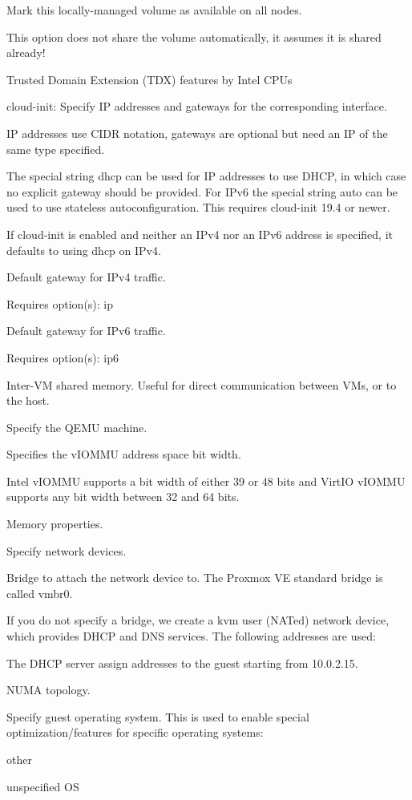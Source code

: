 Mark this locally-managed volume as available on all nodes.

This option does not share the volume automatically, it assumes it is shared already!

Trusted Domain Extension (TDX) features by Intel CPUs

cloud-init: Specify IP addresses and gateways for the corresponding interface.

IP addresses use CIDR notation, gateways are optional but need an IP of the same type specified.

The special string dhcp can be used for IP addresses to use DHCP, in which case no explicit gateway should be provided. For IPv6 the special string auto can be used to use stateless autoconfiguration. This requires cloud-init 19.4 or newer.

If cloud-init is enabled and neither an IPv4 nor an IPv6 address is specified, it defaults to using dhcp on IPv4.

Default gateway for IPv4 traffic.

Requires option(s): ip

Default gateway for IPv6 traffic.

Requires option(s): ip6

Inter-VM shared memory. Useful for direct communication between VMs, or to the host.

Specify the QEMU machine.

Specifies the vIOMMU address space bit width.

Intel vIOMMU supports a bit width of either 39 or 48 bits and VirtIO vIOMMU supports any bit width between 32 and 64 bits.

Memory properties.

Specify network devices.

Bridge to attach the network device to. The Proxmox VE standard bridge is called vmbr0.

If you do not specify a bridge, we create a kvm user (NATed) network device, which provides DHCP and DNS services. The following addresses are used:

The DHCP server assign addresses to the guest starting from 10.0.2.15.

NUMA topology.

Specify guest operating system. This is used to enable special optimization/features for specific operating systems:

other

unspecified OS

